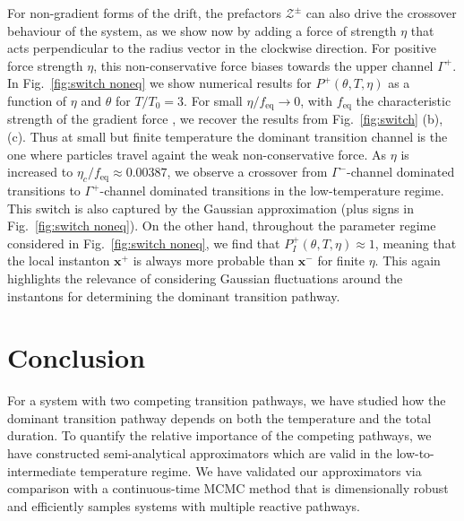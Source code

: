For non-gradient forms of the drift, the prefactors $\mathcal{Z^{\pm}}$
can also drive the crossover behaviour of the system, as we show now
by adding a force of strength $\eta$ that acts perpendicular to the
radius vector in the clockwise direction. For positive force strength
$\eta$, this non-conservative force biases towards the upper channel
$\Gamma^{+}$. In Fig.~\ref{fig:switch noneq} we show numerical
results for $P^{+}(\theta,T,\eta)$ as a function of $\eta$ and $\theta$
for $T/T_{0}=3$. For small $\eta/f_{\text{eq}}\rightarrow0$, with
$f_{\text{eq}}$ the characteristic strength of the gradient force
\citep{note:SI}, we recover the results from Fig.~\ref{fig:switch}
(b), (c). Thus at small but finite temperature the dominant transition
channel is the one where particles travel againt the weak non-conservative
force. As $\eta$ is increased to $\eta_{c}/f_{\text{eq}}\approx0.00387$,
we observe a crossover from $\Gamma^{-}$-channel dominated transitions
to $\Gamma^{+}$-channel dominated transitions in the low-temperature
regime. This switch is also captured by the Gaussian approximation
(plus signs in Fig.~\ref{fig:switch noneq}). On the other hand,
throughout the parameter regime considered in Fig.~\ref{fig:switch noneq},
we find that $P_{I}^{+}(\theta,T,\eta)\approx1$, meaning that the
local instanton $\mathbf{x}^{+}$ is always more probable than $\mathbf{x}^{-}$
for finite $\eta$. This again highlights the relevance of considering
Gaussian fluctuations around the instantons for determining the dominant
transition pathway.

\section{Conclusion}

For a system with two competing transition pathways,
we have studied how the dominant transition pathway depends on both
the temperature and the total duration. To quantify the relative importance
of the competing pathways, we have constructed semi-analytical approximators
which are valid in the low-to-intermediate temperature regime. We
have validated our approximators via comparison with a continuous-time
MCMC method that is dimensionally robust and efficiently samples systems
with multiple reactive pathways.

